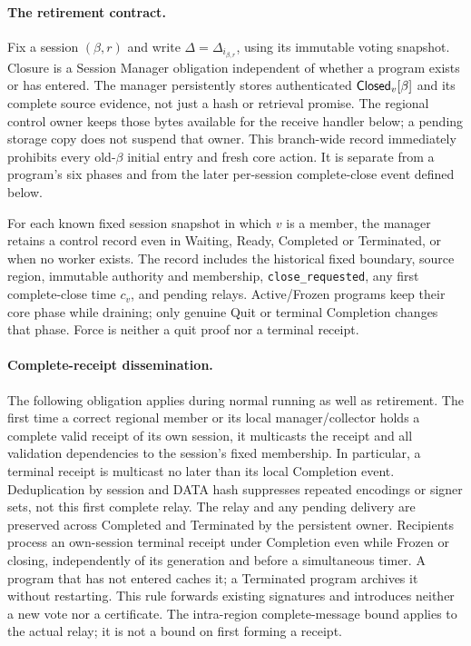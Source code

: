 \paragraph{The retirement contract.}
\label{sec:retirement}
Fix a session $(\beta,r)$ and write $\Delta=\Delta_{i_{\beta,r}}$,
using its immutable voting snapshot. Closure is a Session Manager
obligation independent of whether a program exists or has entered.
The manager persistently stores authenticated $\mathsf{Closed}_v[\beta]$
and its complete source evidence, not just a hash or retrieval promise.
The regional control owner keeps those bytes available for the receive
handler below; a pending storage copy does not suspend that owner.
This branch-wide record immediately
prohibits every old-$\beta$ initial entry and fresh core action.
It is separate from a program's six phases and from the later
per-session complete-close event defined below.

For each known fixed session snapshot in which $v$ is a member, the
manager retains a control record even in Waiting, Ready, Completed or
Terminated, or when no worker exists. The record includes the historical
fixed boundary, source region, immutable authority and membership,
\texttt{close\_requested}, any first complete-close time $c_v$, and
pending relays. Active/Frozen programs keep their core phase while
draining; only genuine Quit or terminal Completion changes that phase.
Force is neither a quit proof nor a terminal receipt.

\paragraph{Complete-receipt dissemination.}
\label{sec:retirement-receipt-relay}
The following obligation applies during normal running as well as
retirement. The first time a correct regional member or its local
manager/collector holds a complete valid receipt of its own session,
it multicasts the receipt and all validation dependencies to the
session's fixed membership. In particular, a terminal receipt is
multicast no later than its local Completion event. Deduplication by
session and DATA hash suppresses repeated encodings or signer sets,
not this first complete relay. The relay and any pending delivery are
preserved across Completed and Terminated by the persistent owner.
Recipients process an own-session terminal receipt under Completion
even while Frozen or closing, independently of its generation and
before a simultaneous timer. A program that has not entered caches
it; a Terminated program archives it without restarting. This rule
forwards existing signatures and introduces neither a new vote nor a
certificate. The intra-region complete-message bound applies to the
actual relay; it is not a bound on first forming a receipt.

